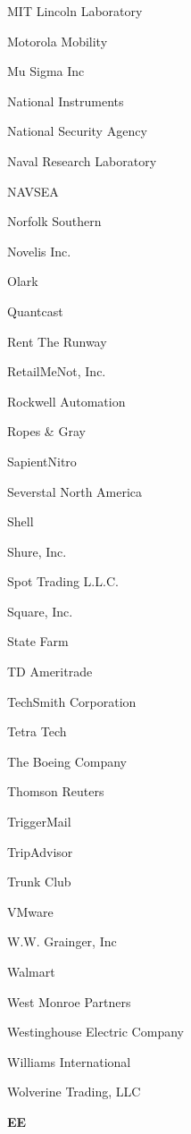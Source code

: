 \documentclass[twoside]{article}
\begin{document}
\begin{center}
\begin{multicols}{5}
\begin{FlushLeft}
\begin{compactitem}
\item MIT Lincoln Laboratory
\item Motorola Mobility
\item Mu Sigma Inc
\item National Instruments
\item National Security Agency
\item Naval Research Laboratory
\item NAVSEA
\item Norfolk Southern
\item Novelis Inc.
\item Olark
\item Quantcast
\item Rent The Runway
\item RetailMeNot, Inc.
\item Rockwell Automation
\item Ropes \& Gray
\item SapientNitro
\item Severstal North America
\item Shell
\item Shure, Inc.
\item Spot Trading L.L.C.
\item Square, Inc.
\item State Farm
\item TD Ameritrade
\item TechSmith Corporation
\item Tetra Tech
\item The Boeing Company
\item Thomson Reuters
\item TriggerMail
\item TripAdvisor
\item Trunk Club
\item VMware
\item W.W. Grainger, Inc
\item Walmart
\item West Monroe Partners
\item Westinghouse Electric Company
\item Williams International
\item Wolverine Trading, LLC
\end{compactitem}
        \end{FlushLeft}
        \vspace{1em}
        {\fontsize{14}{16}\selectfont \bf EE}\\
        \vspace{-1em}

\end{multicols}
\end{center}
\end{document}
